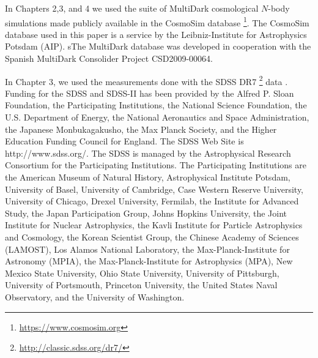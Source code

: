 


In Chapters 2,3, and 4 we used the suite of MultiDark cosmological $N$-body simulations made publicly available in the CosmoSim database \footnote{\url{https://www.cosmosim.org}}. The CosmoSim database used in this paper is a service by the Leibniz-Institute for Astrophysics Potsdam (AIP). sThe MultiDark database was developed in cooperation with the Spanish MultiDark Consolider Project CSD2009-00064.

In Chapter 3, we used the measurements done with the SDSS DR7 \footnote{\url{http://classic.sdss.org/dr7/}} data \citep{abazajian2009}. 
Funding for the SDSS and SDSS-II has been provided by the Alfred P. Sloan Foundation, the Participating Institutions, the National Science Foundation, the U.S. Department of Energy, the National Aeronautics and Space Administration, the Japanese Monbukagakusho, the Max Planck Society, and the Higher Education Funding Council for England. The SDSS Web Site is http://www.sdss.org/. The SDSS is managed by the Astrophysical Research Consortium for the Participating Institutions. The Participating Institutions are the American Museum of Natural History, Astrophysical Institute Potsdam, University of Basel, University of Cambridge, Case Western Reserve University, University of Chicago, Drexel University, Fermilab, the Institute for Advanced Study, the Japan Participation Group, Johns Hopkins University, the Joint Institute for Nuclear Astrophysics, the Kavli Institute for Particle Astrophysics and Cosmology, the Korean Scientist Group, the Chinese Academy of Sciences (LAMOST), Los Alamos National Laboratory, the Max-Planck-Institute for Astronomy (MPIA), the Max-Planck-Institute for Astrophysics (MPA), New Mexico State University, Ohio State University, University of Pittsburgh, University of Portsmouth, Princeton University, the United States Naval Observatory, and the University of Washington.

